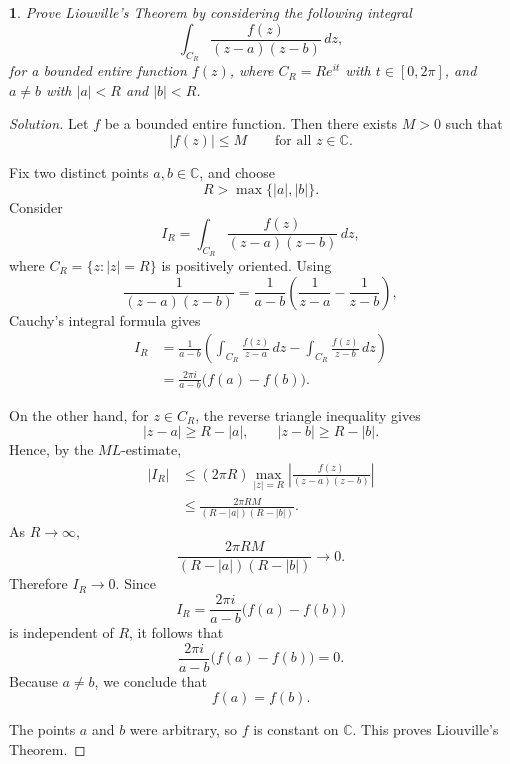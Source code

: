 \documentclass[12pt, a4paper]{report}
\theoremstyle{spaced}
\newtheorem{exercise}{}
\begin{document}
\begin{exercise}
	Prove Liouville's Theorem by considering the following integral
	\[
		\int_{C_R}\frac{f(z)}{(z-a)(z-b)}\,dz,
	\]
	for a bounded entire function \(f(z)\), where \(C_R=Re^{it}\) with
	\(t\in[0,2\pi]\), and \(a\neq b\) with \(|a|<R\) and \(|b|<R\).
\end{exercise}
\begin{proof}[Solution]
	Let \(f\) be a bounded entire function. Then there exists \(M>0\) such
	that
	\[
		|f(z)|\leq M
		\qquad\text{for all } z\in\mathbb C.
	\]

	Fix two distinct points \(a,b\in\mathbb C\), and choose
	\[
		R>\max\{|a|,|b|\}.
	\]
	Consider
	\[
		I_R=\int_{C_R}\frac{f(z)}{(z-a)(z-b)}\,dz,
	\]
	where \(C_R=\{z:|z|=R\}\) is positively oriented.
	Using
	\[
		\frac{1}{(z-a)(z-b)}
		=
		\frac{1}{a-b}
		\left(\frac{1}{z-a}-\frac{1}{z-b}\right),
	\]
	Cauchy's integral formula gives
	\[
		\begin{aligned}
			I_R
			 & =
			\frac{1}{a-b}
			\left(
			\int_{C_R}\frac{f(z)}{z-a}\,dz
			-
			\int_{C_R}\frac{f(z)}{z-b}\,dz
			\right) \\
			 & =
			\frac{2\pi i}{a-b}\bigl(f(a)-f(b)\bigr).
		\end{aligned}
	\]

	On the other hand, for \(z\in C_R\), the reverse triangle inequality
	gives
	\[
		|z-a|\geq R-|a|,
		\qquad
		|z-b|\geq R-|b|.
	\]
	Hence, by the \(ML\)-estimate,
	\[
		\begin{aligned}
			|I_R|
			 & \leq
			(2\pi R)
			\max_{|z|=R}
			\left|
			\frac{f(z)}{(z-a)(z-b)}
			\right| \\
			 & \leq
			\frac{2\pi RM}{(R-|a|)(R-|b|)}.
		\end{aligned}
	\]
	As \(R\to\infty\),
	\[
		\frac{2\pi RM}{(R-|a|)(R-|b|)}
		\longrightarrow 0.
	\]
	Therefore \(I_R\to0\). Since
	\[
		I_R=\frac{2\pi i}{a-b}\bigl(f(a)-f(b)\bigr)
	\]
	is independent of \(R\), it follows that
	\[
		\frac{2\pi i}{a-b}\bigl(f(a)-f(b)\bigr)=0.
	\]
	Because \(a\neq b\), we conclude that
	\[
		f(a)=f(b).
	\]

	The points \(a\) and \(b\) were arbitrary, so \(f\) is constant on
	\(\mathbb C\). This proves Liouville's Theorem.
\end{proof}
\end{document}
